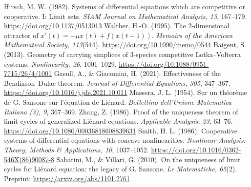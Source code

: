  Hirsch, M. W. (1982). Systems of differential equations which are competitive or cooperative. I: Limit sets. \emph{SIAM Journal on Mathematical Analysis, 13}, 167--179. \url{https://doi.org/10.1137/0513013}
 Walther, H.-O. (1995). The 2-dimensional attractor of $x'(t)=-\mu x(t)+f(x(t-1))$. \emph{Memoirs of the American Mathematical Society, 113}(544). \url{https://doi.org/10.1090/memo/0544}
 Baigent, S. (2013). Geometry of carrying simplices of 3-species competitive Lotka--Volterra systems. \emph{Nonlinearity, 26}, 1001--1029. \url{https://doi.org/10.1088/0951-7715/26/4/1001}
 Gasull, A., \& Giacomini, H. (2021). Effectiveness of the Bendixson--Dulac theorem. \emph{Journal of Differential Equations, 305}, 347--367. \url{https://doi.org/10.1016/j.jde.2021.10.011}
 Massera, J. L. (1954). Sur un th\'eor\`eme de G. Sansone sur l'\'equation de Li\'enard. \emph{Bollettino dell'Unione Matematica Italiana (3), 9}, 367--369.
 Zhang, Z. (1986). Proof of the uniqueness theorem of limit cycles of generalized Li\'enard equations. \emph{Applicable Analysis, 23}, 63--76. \url{https://doi.org/10.1080/00036818608839631}
 Smith, H. L. (1986). Cooperative systems of differential equations with concave nonlinearities. \emph{Nonlinear Analysis: Theory, Methods \& Applications, 10}, 1037--1052. \url{https://doi.org/10.1016/0362-546X(86)90087-8}
 Sabatini, M., \& Villari, G. (2010). On the uniqueness of limit cycles for Li\'enard equation: the legacy of G. Sansone. \emph{Le Matematiche, 65}(2). Preprint: \url{https://arxiv.org/abs/1101.2761}
